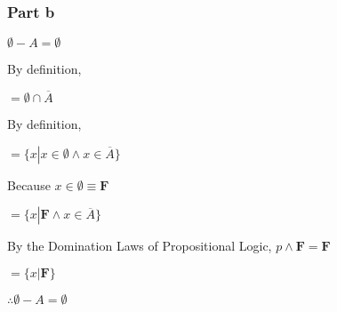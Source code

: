 \documentclass[12pt]{article}
\begin{document}
\subsubsection*{Part b}

$\emptyset - A = \emptyset$

By definition, 

$= \emptyset \cap \overline{A}$

By definition,

$= \{ x \left| x \in \emptyset \land x \in \overline{A} \right.\}$

Because $x \in \emptyset \equiv \mathbf{F}$

$= \{ x \left| \mathbf{F} \land x \in \overline{A} \right.\}$

By the Domination Laws of Propositional Logic, $p \land \mathbf{F} = \mathbf{F}$

$= \{ x \left| \mathbf{F} \right.\}$

$\therefore \emptyset - A = \emptyset$
\end{document}
